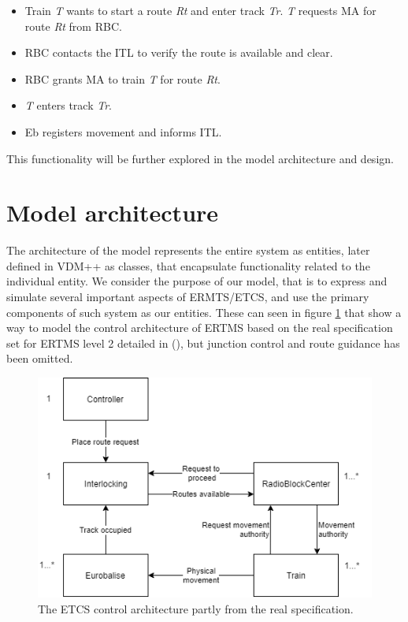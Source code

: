 \documentclass[preprint,12pt]{elsarticle}
\begin{document}
\begin{itemize}[noitemsep]
	\item Train \textit{T} wants to start a route \textit{Rt} and enter track \textit{Tr}. \textit{T} requests MA for route \textit{Rt} from RBC.
	\item RBC contacts the ITL to verify the route is available and clear.
	\item RBC grants MA to train \textit{T} for route \textit{Rt}.
	\item \textit{T} enters track \textit{Tr}.
	\item Eb registers movement and informs ITL.
\end{itemize}

This functionality will be further explored in the model architecture and design.

\section{Model architecture}
\label{S:systemarch}

The architecture of the model represents the entire system as entities, later defined in VDM++ as classes, that encapsulate functionality related to the individual entity. We consider the purpose of our model, that is to express and simulate several important aspects of ERMTS/ETCS, and use the primary components of such system as our entities. These can seen in figure \ref{fig:ertmscontrolarchitecture} that show a way to model the control architecture of ERTMS based on the real specification set for ERTMS level 2 detailed in (\citet{Berger2018}), but junction control and route guidance has been omitted.

\begin{figure}[h]
	\centering
	\includegraphics[width=0.8\linewidth]{ERTMSControl.png}
	\caption{The ETCS control architecture partly from the real specification.}
	\label{fig:ertmscontrolarchitecture}
\end{figure}
\end{document}
